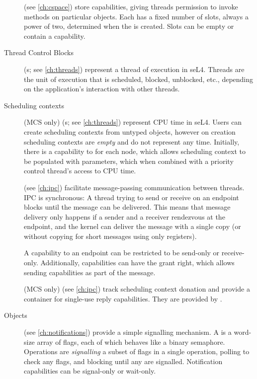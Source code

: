 \begin{description}

    \item[] (see \autoref{ch:cspace}) store capabilities, giving threads permission to
    invoke methods on particular objects.
    Each  has a fixed number of slots,
    always a power of two, determined when the  is created. Slots
    can be empty or contain a capability.

    \item[Thread Control Blocks] (s; see \autoref{ch:threads}) represent a thread of
    execution in seL4. Threads are the unit of execution that is
    scheduled, blocked, unblocked, etc., depending on the application's
    interaction with other threads.

   \item[Scheduling contexts] (MCS only) (s; see \autoref{ch:threads}) represent
       CPU time in seL4. Users can create scheduling contexts from untyped objects, however on
       creation scheduling contexts are \textit{empty} and do not represent any time.
       Initially, there is a capability to  for each node, which
       allows scheduling context to be populated with parameters, which when combined with a priority
       control thread's access to CPU time.

    \item[] (see \autoref{ch:ipc}) facilitate message-passing
    communication between threads. IPC is synchronous: A thread
    trying to send or receive on an endpoint blocks until the message
    can be delivered. This means that message delivery only happens if
    a sender and a receiver rendezvous at the endpoint, and the
    kernel can deliver the message with a single copy (or without
    copying for short messages using only registers).

    A capability to an endpoint can be restricted to be
    send-only or receive-only. Additionally, 
    capabilities can have the grant right, which allows sending
    capabilities as part of the message.

   \item[] (MCS only) (see \autoref{ch:ipc}) track scheduling
    context donation and provide a container for single-use reply capabilities.
    They are provided by .

    \item[ Objects] (see \autoref{ch:notifications})
      provide a simple signalling mechanism. A 
      is a word-size array of flags, each of which behaves like a binary semaphore. Operations
      are \emph{signalling} a subset of flags in a single operation,
      polling to check any flags,
      and blocking until any are signalled. Notification capabilities
      can be signal-only or wait-only.


\end{description}
